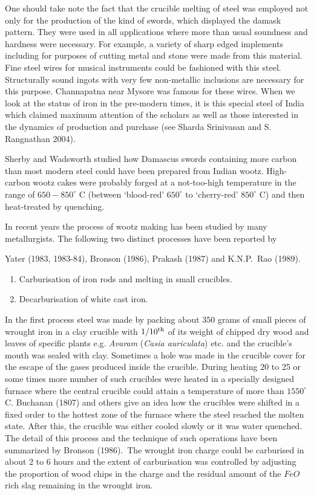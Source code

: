 One should take note the fact that the crucible melting of steel was employed not only for the production of the kind of swords, which displayed the damask pattern. They were used in all applications where more than usual soundness and hardness were necessary. For example, a variety of sharp edged implements including for purposes of cutting metal and stone were made from this material. Fine steel wires for musical instruments could be fashioned with this steel. Structurally sound ingots with very few non-metallic inclusions are necessary for this purpose. Channapatna near Mysore was famous for these wires. When we look at the status of iron in the pre-modern times, it is this special steel of India which claimed maximum attention of the scholars as well as those interested in the dynamics of production and purchase (see Sharda Srinivasan and S. Rangnathan 2004).

Sherby and Wadsworth studied how Damascus swords containing more carbon than most modern steel could have been prepared from Indian wootz. High-carbon wootz cakes were probably forged at a not-too-high temperature in the range of $650-850^\circ$ C (between ‘blood-red’ $650^\circ$ to ‘cherry-red’ $850^\circ$ C) and then heat-treated by quenching. 

In recent years the process of wootz making has been studied by many metallurgists. The following two distinct processes have been reported by 

Yater (1983, 1983-84), Bronson (1986), Prakash (1987) and K.N.P.~Rao (1989).


\begin{enumerate}
\item Carburisation of iron rods and melting in small crucibles.
\item Decarburisation of white cast iron.
\end{enumerate}

In the first process steel was made by packing about 350 grams of small pieces of wrought iron in a clay crucible with $1/10^{\rm th}$ of its weight of chipped dry wood and leaves of specific plants e.g. {\it Avaram} ({\it Casia auriculata}) etc. and the crucible's mouth was sealed with clay. Sometimes a hole was made in the crucible cover for the escape of the gases produced inside the crucible. During heating 20 to 25 or some times more number of such crucibles were heated in a specially designed furnace where the central crucible could attain a temperature of more than $1550^\circ$C. Buchanan (1807) and others give an idea how the crucibles were shifted in a fixed order to the hottest zone of the furnace where the steel reached the molten state. After this, the crucible was either cooled slowly or it was water quenched. The detail of this process and the technique of such operations have been summarized by Bronson (1986).~The wrought iron charge could be carburised in about 2 to 6 hours and the extent of carburisation was controlled by adjusting the proportion of wood chips in the charge and the residual amount of the $FeO$ rich slag remaining in the wrought iron.

